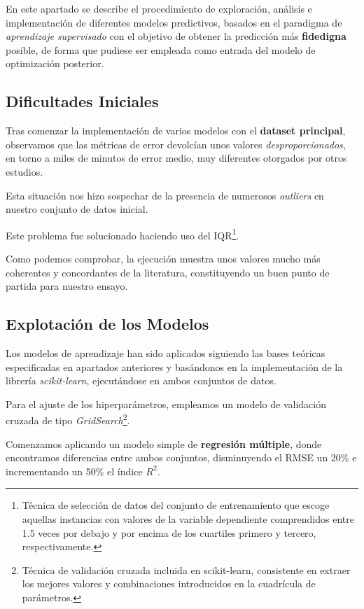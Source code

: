 En este apartado se describe el procedimiento de exploración, análisis e implementación de diferentes modelos predictivos, basados en el paradigma de \textit{aprendizaje supervisado} con el objetivo de obtener la predicción más \textbf{fidedigna} posible, de forma que pudiese ser empleada como entrada del modelo de optimización posterior.

\subsection{Dificultades Iniciales}

Tras comenzar la implementación de varios modelos con el \textbf{dataset principal}, observamos que las métricas de error devolcían unos valores \textit{desproporcionados}, en torno a miles de minutos de error medio, muy diferentes  otorgados por otros estudios\cite{ShahabiKargar2014PredictingSurgery}.

Esta situación nos hizo sospechar de la presencia de numerosos \textit{outliers} en nuestro conjunto de datos inicial. 

Este problema fue solucionado haciendo uso del IQR\footnote{Técnica de selección de datos del conjunto de entrenamiento que escoge aquellas instancias con valores de la variable dependiente comprendidos entre 1.5 veces por debajo y por encima de los cuartiles primero y tercero, respectivamente.}\cite{Bonthu2021DetectingOutliers}.

Como podemos comprobar, la ejecución muestra unos valores mucho más coherentes y concordantes de la literatura, constituyendo un buen punto de partida para nuestro ensayo.

\subsection{Explotación de los Modelos}

Los modelos de aprendizaje han sido aplicados siguiendo las bases teóricas especificadas en apartados anteriores y basándonos en la implementación de la librería \textit{scikit-learn}\cite{2021Scikit-LearnPython}, ejecutándose en ambos conjuntos de datos.

Para el ajuste de los hiperparámetros, empleamos un modelo de validación cruzada de tipo \textit{GridSearch}\footnote{Técnica de validación cruzada incluida en scikit-learn, consistente en extraer los mejores valores y combinaciones introducidos en la cuadrícula de parámetros.}.

Comenzamos aplicando un modelo simple de \textbf{regresión múltiple}, donde encontramos diferencias entre ambos conjuntos,  disminuyendo el RMSE un 20\% e incrementando un 50\% el índice $R^{2}$.

